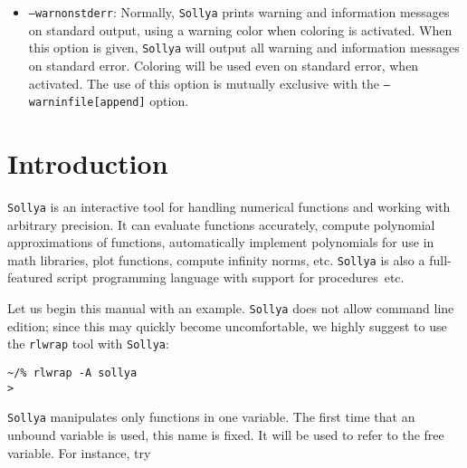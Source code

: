 \documentclass[a4paper]{article}
\newcommand{\sollya}{\texttt{Sollya}\xspace}
\newcommand{\rlwrap}{\texttt{rlwrap}\xspace}
\begin{document}
\begin{itemize}
  \texttt{--warninfile} is used, the existing content (if any) of the
  file is first removed before writing to the file. With
  \texttt{--warninfileappend}, the messages are appended to an
  existing file. Even if coloring is used for the displaying all other
  \sollya output, no coloring sequences are ever written to the
  file. Let us emphasize on the fact that any file of a unixoid system
  can be used for output, for instance also a named pipe. This allows
  for error messaging to be performed on a separate terminal. The use
  of this option is mutually exclusive with the
  \texttt{--warnonstderr} option.
\item \texttt{--warnonstderr}: Normally, \sollya prints warning and
  information messages on standard output, using a warning color 
  when coloring is activated. When this option is given, \sollya will 
  output all warning and information messages on standard error. Coloring
  will be used even on standard error, when activated. The use of 
  this option is mutually exclusive with the \texttt{--warninfile[append]} 
  option.
\end{itemize}


\section{Introduction}
\sollya is an interactive tool for handling numerical functions and working with arbitrary precision. It can evaluate functions accurately, compute polynomial approximations of functions, automatically implement polynomials for use in math libraries, plot functions, compute infinity norms, etc. \sollya is also a full-featured script programming language with support for procedures~etc.

Let us begin this manual with an example. \sollya does not allow command line edition; since this may quickly become uncomfortable, we highly suggest to use the \rlwrap tool with \sollya:

\begin{center}\begin{minipage}{15cm}\begin{Verbatim}[frame=single]
~/% rlwrap -A sollya
>
\end{Verbatim}
\end{minipage}\end{center}

\sollya manipulates only functions in one variable. The first time that an unbound variable is used, this name is fixed. It will be used to refer to the free variable. For instance, try
\end{document}
